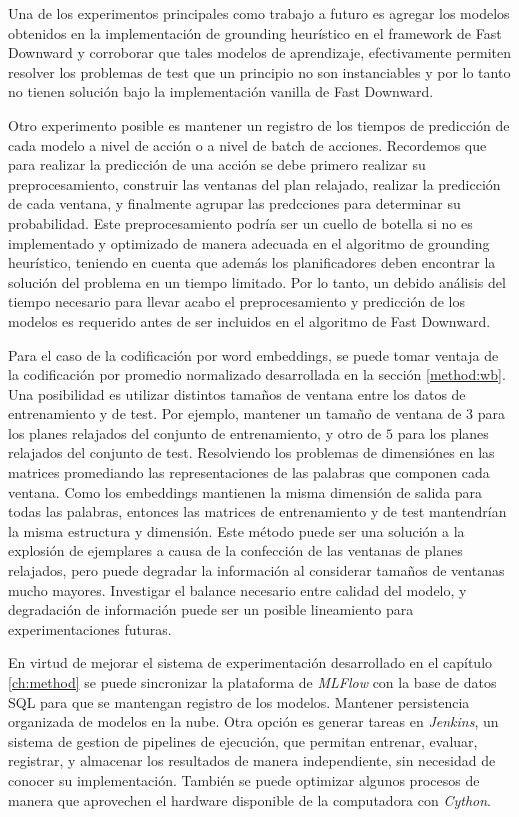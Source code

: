 Una de los experimentos principales como trabajo a futuro es agregar los modelos
obtenidos en la implementación de grounding heurístico en el framework de Fast
Downward y corroborar que tales modelos de aprendizaje, efectivamente permiten
resolver los problemas de test que un principio no son instanciables y por lo
tanto no tienen solución bajo la implementación vanilla de Fast Downward.

Otro experimento posible es mantener un registro de los tiempos de predicción de
cada modelo a nivel de acción o a nivel de batch de acciones. Recordemos que
para realizar la predicción de una acción se debe primero realizar su
preprocesamiento, construir las ventanas del plan relajado, realizar la
predicción de cada ventana, y finalmente agrupar las predcciones para determinar
su probabilidad. Este preprocesamiento podría ser un cuello de botella si no es
implementado y optimizado de manera adecuada en el algoritmo de grounding
heurístico, teniendo en cuenta que además los planificadores deben encontrar la
solución del problema en un tiempo limitado. Por lo tanto, un debido análisis
del tiempo necesario para llevar acabo el preprocesamiento y predicción de los
modelos es requerido antes de ser incluidos en el algoritmo de Fast Downward.

Para el caso de la codificación por word embeddings, se puede tomar ventaja de
la codificación por promedio normalizado desarrollada en la sección
\ref{method:wb}. Una posibilidad es utilizar distintos tamaños de ventana entre
los datos de entrenamiento y de test. Por ejemplo, mantener un tamaño de ventana
de $3$ para los planes relajados del conjunto de entrenamiento, y otro de $5$
para los planes relajados del conjunto de test. Resolviendo los problemas de
dimensiónes en las matrices promediando las representaciones de las palabras que
componen cada ventana. Como los embeddings mantienen la misma dimensión de
salida para todas las palabras, entonces las matrices de entrenamiento y de test
mantendrían la misma estructura y dimensión. Este método puede ser una solución
a la explosión de ejemplares a causa de la confección de las ventanas de planes
relajados, pero puede degradar la información al considerar tamaños de ventanas
mucho mayores. Investigar el balance necesario entre calidad del modelo, y
degradación de información puede ser un posible lineamiento para
experimentaciones futuras.

En virtud de mejorar el sistema de experimentación desarrollado en el capítulo
\ref{ch:method} se puede sincronizar la plataforma de \emph{MLFlow} con la base
de datos SQL para que se mantengan registro de los modelos. Mantener
persistencia organizada de modelos en la nube. Otra opción es generar tareas en
\emph{Jenkins}, un sistema de gestion de pipelines de ejecución, que permitan
entrenar, evaluar, registrar, y almacenar los resultados de manera
independiente, sin necesidad de conocer su implementación. También se puede
optimizar algunos procesos de manera que aprovechen el hardware disponible de la
computadora con \emph{Cython}.
